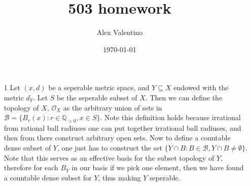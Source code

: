 \documentclass[12pt, letterpaper]{article}
\date{\today}
\author{Alex Valentino}
\title{503 homework}
\newcommand{\Q}{\mathbb{Q}}
\begin{document}
\begin{enumerate}
	\item[1] Let $(x,d)$ be a seperable metric space, and $Y \subseteq X$ endowed with the 
	metric $d_Y$.  Let $S$ be the seperable subset of $X$.  Then we can define the 
	topology of $X$, $\mathcal{O}_X$ as the arbitrary union of sets in $\mathcal{B} = \{B_{r}(x): r \in \Q_{>0}, x \in S\}$.  Note this definition holds because irrational from rational 
	ball radiuses one can put together irrational ball radiuses, and then from there 
	construct arbitrary open sets.  Now to define a countable dense subset of $Y$, one 
	just has to construct the set $\{Y \cap B: B \in \mathcal{B}, Y \cap B \neq \emptyset \}$.  Note that this serves as an effective basis for the subset topology of $Y$, therefore
	for each $B_Y$ in our basis if we pick one element, then we have found a countable dense subset for $Y$, thus making $Y$ seperable.
	

\end{enumerate}
\end{document}
